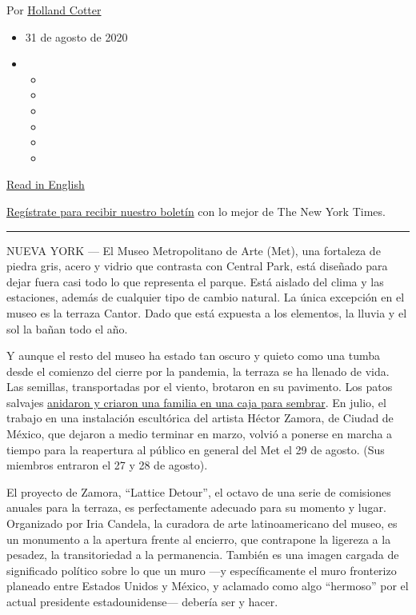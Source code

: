 Por \href{https://www.nytimes3xbfgragh.onion/by/holland-cotter}{Holland
Cotter}

\begin{itemize}
\item
  31 de agosto de 2020
\item
  \begin{itemize}
  \item
  \item
  \item
  \item
  \item
  \item
  \end{itemize}
\end{itemize}

\href{https://www.nytimes3xbfgragh.onion/2020/08/27/arts/design/met-roof-hector-zamora-wall.html}{Read
in English}

\href{https://www.nytimes3xbfgragh.onion/newsletters/el-times}{Regístrate
para recibir nuestro boletín} con lo mejor de The New York Times.

\begin{center}\rule{0.5\linewidth}{\linethickness}\end{center}

NUEVA YORK --- El Museo Metropolitano de Arte (Met), una fortaleza de
piedra gris, acero y vidrio que contrasta con Central Park, está
diseñado para dejar fuera casi todo lo que representa el parque. Está
aislado del clima y las estaciones, además de cualquier tipo de cambio
natural. La única excepción en el museo es la terraza Cantor. Dado que
está expuesta a los elementos, la lluvia y el sol la bañan todo el año.

Y aunque el resto del museo ha estado tan oscuro y quieto como una tumba
desde el comienzo del cierre por la pandemia, la terraza se ha llenado
de vida. Las semillas, transportadas por el viento, brotaron en su
pavimento. Los patos salvajes
\href{https://www.instagram.com/p/CDB3hhylj_Y/}{anidaron y criaron una
familia en una caja para sembrar}. En julio, el trabajo en una
instalación escultórica del artista Héctor Zamora, de Ciudad de México,
que dejaron a medio terminar en marzo, volvió a ponerse en marcha a
tiempo para la reapertura al público en general del Met el 29 de agosto.
(Sus miembros entraron el 27 y 28 de agosto).

El proyecto de Zamora, ``Lattice Detour'', el octavo de una serie de
comisiones anuales para la terraza, es perfectamente adecuado para su
momento y lugar. Organizado por Iria Candela, la curadora de arte
latinoamericano del museo, es un monumento a la apertura frente al
encierro, que contrapone la ligereza a la pesadez, la transitoriedad a
la permanencia. También es una imagen cargada de significado político
sobre lo que un muro ---y específicamente el muro fronterizo planeado
entre Estados Unidos y México, y aclamado como algo ``hermoso'' por el
actual presidente estadounidense--- debería ser y hacer.

